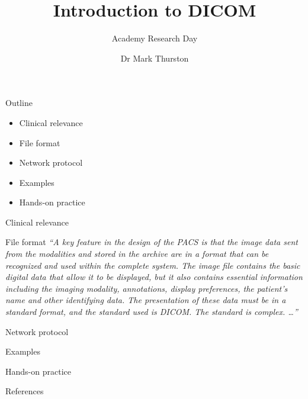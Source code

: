 \documentclass{beamer}
\title{Introduction to DICOM}
\subtitle{Academy Research Day}
\author{Dr Mark Thurston}
\institute{\href{https://github.com/plymouth-neuroimaging/research-academy
    }{\faGithub{} plymouth-neuroimaging}
}
\date{\DTMdisplaydate{2023}{07}{28}{Friday}}
\begin{document}
\begin{frame}
    \titlepage{}
\end{frame}

\begin{frame}{Outline}
    \begin{itemize}
        \item{Clinical relevance}
        \item{File format}
        \item{Network protocol}
        \item{Examples}
        \item{Hands-on practice}
    \end{itemize}
\end{frame}

\begin{frame}{Clinical relevance}
\end{frame}

\begin{frame}{File format}
    \tiny\textit{{``A key feature in the design of the PACS is that the image
    data sent from the modalities and stored in the archive are in a format
    that can be recognized and used within the complete system. The image file
    contains the basic digital data that allow it to be displayed, but it also
    contains essential information including the imaging modality, annotations,
    display preferences, the patient’s name and other identifying data. The
    presentation of these data must be in a standard format, and the standard
    used is DICOM. The standard is complex. \ldots{}}''
    }\cite[88]{allisy-roberts_farrs_2008}
\end{frame}

\begin{frame}{Network protocol}
\end{frame}

\begin{frame}{Examples}
\end{frame}

\begin{frame}{Hands-on practice}
\end{frame}

\begin{frame}{References}
    \printbibliography{}
\end{frame}
\end{document}
